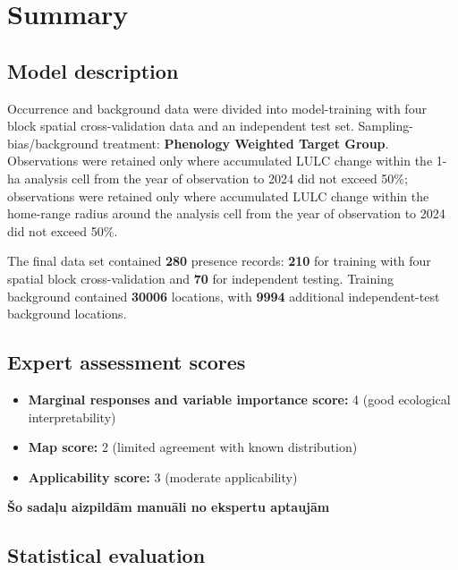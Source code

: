 \documentclass[
  openany]{book}
\providecommand{\tightlist}{%
  \setlength{\itemsep}{0pt}\setlength{\parskip}{0pt}}
\providecommand{\tightlist}{%
  \setlength{\itemsep}{0pt}%
  \setlength{\parskip}{0pt}%
}
\begin{document}
\section*{Summary}\label{summary-2}

\subsection*{Model description}\label{model-description-2}

Occurrence and background data were divided into model-training with four block spatial cross-validation data and an independent test set. Sampling-bias/background treatment: \textbf{Phenology Weighted Target Group}. Observations were retained only where accumulated LULC change within the 1-ha analysis cell from the year of observation to 2024 did not exceed 50\%; observations were retained only where accumulated LULC change within the home-range radius around the analysis cell from the year of observation to 2024 did not exceed 50\%.

The final data set contained \textbf{280} presence records: \textbf{210} for training with four spatial block cross-validation and \textbf{70} for independent testing. Training background contained \textbf{30006} locations, with \textbf{9994} additional independent-test background locations.

\subsection*{Expert assessment scores}\label{expert-assessment-scores-2}

\begin{itemize}
\tightlist
\item
  \textbf{Marginal responses and variable importance score:} 4 (good ecological interpretability)
\item
  \textbf{Map score:} 2 (limited agreement with known distribution)
\item
  \textbf{Applicability score:} 3 (moderate applicability)
\end{itemize}

\textbf{Šo sadaļu aizpildām manuāli no ekspertu aptaujām}

\subsection*{Statistical evaluation}\label{statistical-evaluation-2}
\end{document}
